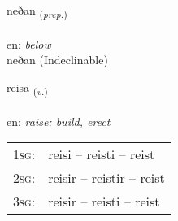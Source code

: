 \documentclass[frontgrid, backgrid]{flacards}\usepackage[]{graphicx}\usepackage[]{color}
\begin{document}

\renewcommand{\flhead}{\vskip5pt \fboxsep=0pt {\small\bfseries\footnotesize Forsetning | Preposition}}
\renewcommand{\fcfoot}{\vskip5pt \fboxsep=0pt \hspace{2pt}{\small\bfseries\footnotesize 2K}}

\renewcommand{\blhead}{\vskip5pt {\small\bfseries\footnotesize Forsetning | Preposition }}
\renewcommand{\bcfoot}{\vskip5pt \hspace{2pt}{\small\bfseries\footnotesize 2K}}


{neðan \small{\textsubscript{(\textit{prep.})}} \\[1ex]
\textphonetic{[nɛːðan]} \\
en: \emph{below} \\  [2ex]
neðan (Indeclinable)}

\renewcommand{\flhead}{\vskip5pt \fboxsep=0pt {\small\bfseries\footnotesize Sagnorð | Verb}}
\renewcommand{\fcfoot}{\vskip5pt \fboxsep=0pt \hspace{2pt}{\small\bfseries\footnotesize 2K}}

\renewcommand{\blhead}{\vskip5pt {\small\bfseries\footnotesize Sagnorð | Verb }}
\renewcommand{\bcfoot}{\vskip5pt \hspace{2pt}{\small\bfseries\footnotesize 2K}}


{reisa \small{\textsubscript{(\textit{v.})}} \\[1ex] %
\textphonetic{[reiːsa]} \\
en: \emph{raise; build, erect} \\  [2ex]
\renewcommand*{\arraystretch}{0.8}
\begin{tabular}{p{1cm}l}
\textsc{1sg}: & reisi -- reisti -- reist \\ 
\textsc{2sg}: & reisir -- reistir -- reist \\ 
\textsc{3sg}: & reisir -- reisti -- reist \\ 
\end{tabular}
}

\renewcommand{\flhead}{\vskip5pt \fboxsep=0pt {\small\bfseries\footnotesize Nafnorð | Noun}}
\renewcommand{\fcfoot}{\vskip5pt \fboxsep=0pt \hspace{2pt}{\small\bfseries\footnotesize 2K}}
\end{document}
